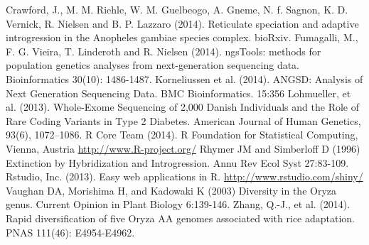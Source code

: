 \documentclass[final]{beamer}
\begin{document}
\begin{frame}[t]
\begin{multicols}{3}
\begin{thebibliography}{99}
 Crawford, J., M. M. Riehle, W. M. Guelbeogo, A. Gneme, N. f. Sagnon, K. D. Vernick, R. Nielsen and B. P. Lazzaro (2014). Reticulate speciation and adaptive introgression in the Anopheles gambiae species complex. bioRxiv.
 Fumagalli, M., F. G. Vieira, T. Linderoth and R. Nielsen (2014). ngsTools: methods for population genetics analyses from next-generation sequencing data. Bioinformatics 30(10): 1486-1487.
 Korneliussen et al. (2014). ANGSD: Analysis of Next Generation Sequencing Data. BMC Bioinformatics. 15:356
 Lohmueller, et al. (2013). Whole-Exome Sequencing of 2,000 Danish Individuals and the Role of Rare Coding Variants in Type 2 Diabetes. American Journal of Human Genetics, 93(6), 1072–1086.
 R Core Team (2014). R Foundation for Statistical Computing, Vienna, Austria \url{http://www.R-project.org/}
 Rhymer JM and Simberloff D (1996) Extinction by Hybridization and Introgression. Annu Rev Ecol Syst 27:83-109.
 Rstudio, Inc. (2013). Easy web applications in R. \url{http://www.rstudio.com/shiny/}
 Vaughan DA, Morishima H, and Kadowaki K (2003) Diversity in the Oryza genus. Current Opinion in Plant Biology 6:139-146.
 Zhang, Q.-J., et al. (2014). Rapid diversification of five Oryza AA genomes associated with rice adaptation. PNAS 111(46): E4954-E4962.

\end{thebibliography}

\end{multicols}

\end{frame}
\end{document}
